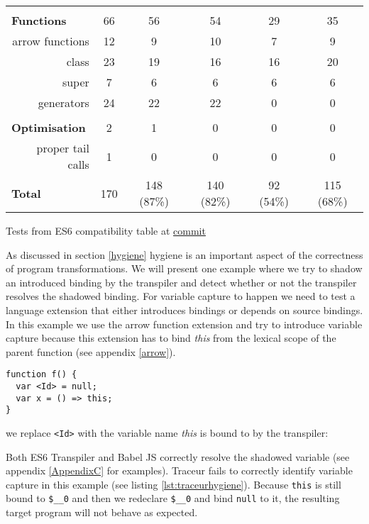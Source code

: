 \begin{table}[h]
{\begin{tabular}{@{}lccccc@{}}
\multicolumn{6}{c}{} \\

{\bf Functions}                     & 66 & 56 & 54 & 29 & 35 \\
\multicolumn{1}{r}{arrow functions} & 12 & 9 & 10 & 7 & 9 \\
\multicolumn{1}{r}{class}           & 23 & 19 & 16 & 16 & 20 \\
\multicolumn{1}{r}{super}           & 7 & 6 & 6 & 6 & 6 \\
\multicolumn{1}{r}{generators}      & 24 & 22 & 22 & 0 & 0 \\

\multicolumn{6}{c}{} \\

{\bf Optimisation}    & 2 & 1 & 0 & 0 & 0                               
\\
\multicolumn{1}{r}{proper tail calls} 2 & 1 & 0 & 0 & 0 & 0 \\

{\bf Total} & 170 & 148 (87\%) & 140 (82\%) & 92 (54\%) & 115 (68\%) \\ \bottomrule
\end{tabular}
}
Tests from ES6 compatibility table at \href{https://github.com/kangax/compat-table/tree/58a790d5b9d4366ea43f75ece7e7f869096227d5}{commit}
\end{table}

As discussed in section \ref{hygiene} hygiene is an important aspect of the correctness of program transformations. We will present one example where we try to shadow an introduced binding by the transpiler and detect whether or not the transpiler resolves the shadowed binding. For variable capture to happen we need to test a language extension that either introduces bindings or depends on source bindings. In this example we use the arrow function extension and try to introduce variable capture because this extension has to bind \textit{this} from the lexical scope of the parent function (see appendix \ref{arrow}).

\begin{lstlisting}[label=traceur-capture, caption=Example input to Traceur\protect\footnotemark]
function f() {
  var <Id> = null;
  var x = () => this;
}
\end{lstlisting}

we replace \lstinline$<Id>$ with the variable name \textit{this} is bound to by the transpiler:

Both ES6 Transpiler and Babel JS correctly resolve the shadowed variable (see appendix \ref{AppendixC} for examples). Traceur fails to correctly identify variable capture in this example (see listing \ref{lst:traceurhygiene}). Because \lstinline$this$ is still bound to \lstinline{$__0} and then we redeclare \lstinline{$__0} and bind \lstinline$null$ to it, the resulting target program will not behave as expected.

